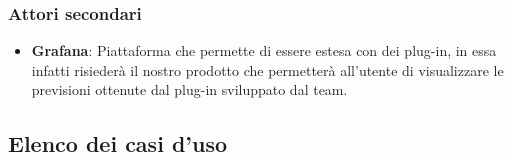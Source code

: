 \documentclass[../analisi-dei-requisiti.tex]{subfiles}
\begin{document}
\subsubsection{Attori secondari}
\label{sssec:attori_secondari}
\begin{itemize}
  \item \textbf{Grafana}: Piattaforma che permette di essere estesa con dei plug-in, in essa infatti risiederà il nostro prodotto che permetterà all'utente di visualizzare le previsioni ottenute dal plug-in sviluppato dal team.
\end{itemize}

\newpage

\subsection{Elenco dei casi d'uso}
\label{subs:elenco_dei_casi_duso}




























































\end{document}
